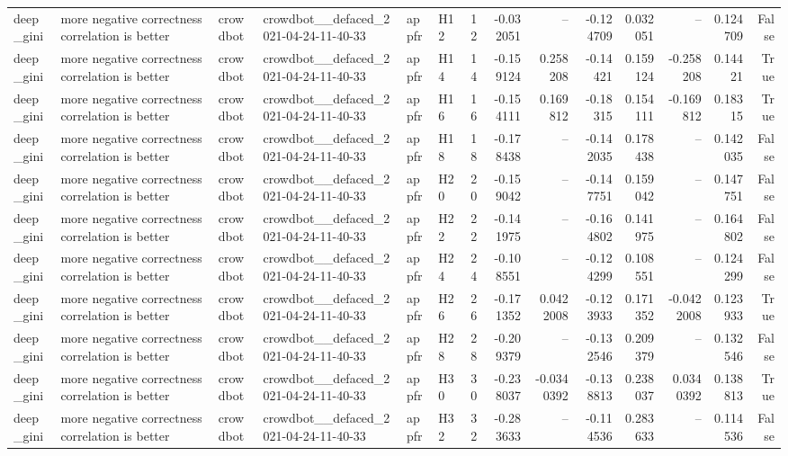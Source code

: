 \begin{longtable}{llllllrrrrrrrr}
deep\_gini & more negative correctness correlation is better & crowdbot & crowdbot\_\_defaced\_2021-04-24-11-40-33 & appfr & H12 & 12 & -0.032051 & -- & -0.124709 & 0.032051 & -- & 0.124709 & False \\
deep\_gini & more negative correctness correlation is better & crowdbot & crowdbot\_\_defaced\_2021-04-24-11-40-33 & appfr & H14 & 14 & -0.159124 & 0.258208 & -0.14421 & 0.159124 & -0.258208 & 0.14421 & True \\
deep\_gini & more negative correctness correlation is better & crowdbot & crowdbot\_\_defaced\_2021-04-24-11-40-33 & appfr & H16 & 16 & -0.154111 & 0.169812 & -0.18315 & 0.154111 & -0.169812 & 0.18315 & True \\
deep\_gini & more negative correctness correlation is better & crowdbot & crowdbot\_\_defaced\_2021-04-24-11-40-33 & appfr & H18 & 18 & -0.178438 & -- & -0.142035 & 0.178438 & -- & 0.142035 & False \\
deep\_gini & more negative correctness correlation is better & crowdbot & crowdbot\_\_defaced\_2021-04-24-11-40-33 & appfr & H20 & 20 & -0.159042 & -- & -0.147751 & 0.159042 & -- & 0.147751 & False \\
deep\_gini & more negative correctness correlation is better & crowdbot & crowdbot\_\_defaced\_2021-04-24-11-40-33 & appfr & H22 & 22 & -0.141975 & -- & -0.164802 & 0.141975 & -- & 0.164802 & False \\
deep\_gini & more negative correctness correlation is better & crowdbot & crowdbot\_\_defaced\_2021-04-24-11-40-33 & appfr & H24 & 24 & -0.108551 & -- & -0.124299 & 0.108551 & -- & 0.124299 & False \\
deep\_gini & more negative correctness correlation is better & crowdbot & crowdbot\_\_defaced\_2021-04-24-11-40-33 & appfr & H26 & 26 & -0.171352 & 0.0422008 & -0.123933 & 0.171352 & -0.0422008 & 0.123933 & True \\
deep\_gini & more negative correctness correlation is better & crowdbot & crowdbot\_\_defaced\_2021-04-24-11-40-33 & appfr & H28 & 28 & -0.209379 & -- & -0.132546 & 0.209379 & -- & 0.132546 & False \\
deep\_gini & more negative correctness correlation is better & crowdbot & crowdbot\_\_defaced\_2021-04-24-11-40-33 & appfr & H30 & 30 & -0.238037 & -0.0340392 & -0.138813 & 0.238037 & 0.0340392 & 0.138813 & True \\
deep\_gini & more negative correctness correlation is better & crowdbot & crowdbot\_\_defaced\_2021-04-24-11-40-33 & appfr & H32 & 32 & -0.283633 & -- & -0.114536 & 0.283633 & -- & 0.114536 & False \\

\end{longtable}
